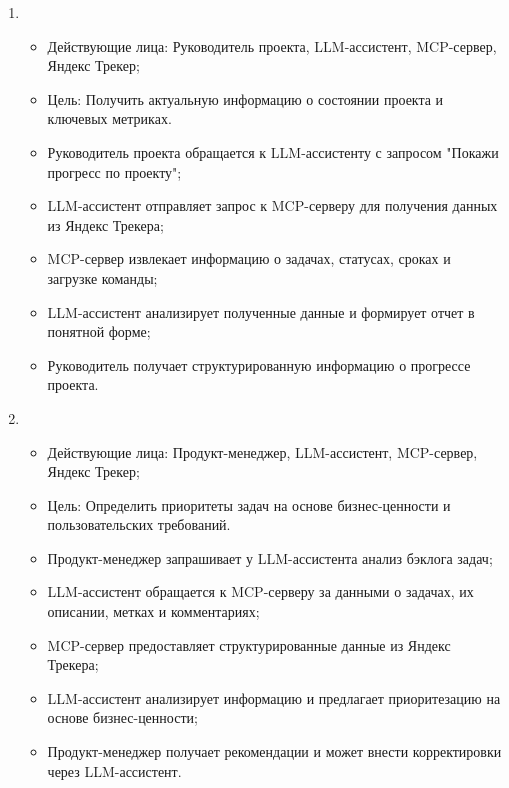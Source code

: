 \documentclass[utf8, russian]{eskdtext}
\begin{document}
\begin{enumerate}
    \item {}\\
    \begin{itemize}
        \item Действующие лица: Руководитель проекта, LLM-ассистент, MCP-сервер, Яндекс Трекер;
        \item Цель: Получить актуальную информацию о состоянии проекта и ключевых метриках.
    \end{itemize}
    \begin{itemize}
        \item Руководитель проекта обращается к LLM-ассистенту с запросом "Покажи прогресс по проекту";
        \item LLM-ассистент отправляет запрос к MCP-серверу для получения данных из Яндекс Трекера;
        \item MCP-сервер извлекает информацию о задачах, статусах, сроках и загрузке команды;
        \item LLM-ассистент анализирует полученные данные и формирует отчет в понятной форме;
        \item Руководитель получает структурированную информацию о прогрессе проекта.
    \end{itemize}

    \item {}\\
    \begin{itemize}
        \item Действующие лица: Продукт-менеджер, LLM-ассистент, MCP-сервер, Яндекс Трекер;
        \item Цель: Определить приоритеты задач на основе бизнес-ценности и пользовательских требований.
    \end{itemize}
    \begin{itemize}
        \item Продукт-менеджер запрашивает у LLM-ассистента анализ бэклога задач;
        \item LLM-ассистент обращается к MCP-серверу за данными о задачах, их описании, метках и комментариях;
        \item MCP-сервер предоставляет структурированные данные из Яндекс Трекера;
        \item LLM-ассистент анализирует информацию и предлагает приоритезацию на основе бизнес-ценности;
        \item Продукт-менеджер получает рекомендации и может внести корректировки через LLM-ассистент.
    \end{itemize}


\end{enumerate}
\end{document}
